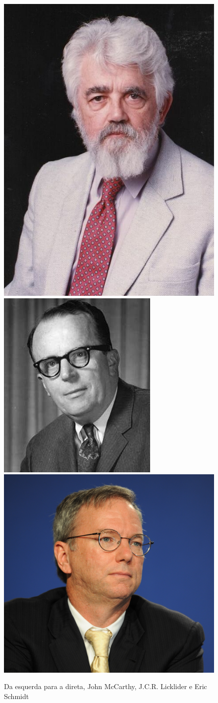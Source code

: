 \begin{figure}[ht]
    \centering
    \includegraphics[height=0.3\textwidth]{img/mcCarthy.jpg}
    \includegraphics[height=0.3\textwidth]{img/licklider.jpg}
    \includegraphics[height=0.3\textwidth]{img/schmidt.jpg}
    \caption{Da esquerda para a direta, John McCarthy, J.C.R. Licklider e Eric Schmidt}
\end{figure}



